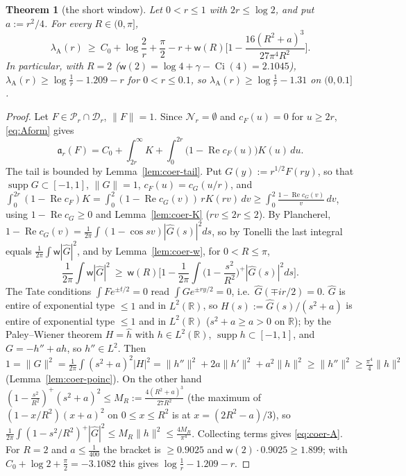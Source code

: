 \documentclass[11pt]{amsart}
\newtheorem{theorem}{Theorem}[section]
\theoremstyle{definition}
\theoremstyle{remark}
\newcommand{\R}{\mathbb R}
\newcommand{\Rel}{\operatorname{Re}}
\newcommand{\supp}{\operatorname{supp}}
\newcommand{\cF}{c_F}
\begin{document}
\begin{theorem}[the short window]\label{thm:coer-A}
Let $0<r\le1$ with $2r\le\log2$, and put $a:=r^2/4$. For every $R\in(0,\pi]$,
\begin{equation}\label{eq:coer-A}
\lambda_{\mathrm A}(r)\ \ge\ C_0+\log\frac2r+\frac\pi2-r+\mathsf w(R)\Big[1-\frac{16(R^2+a)^3}{27\pi^4R^2}\Big].
\end{equation}
In particular, with $R=2$ ($\mathsf w(2)=\log4+\gamma-\operatorname{Ci}(4)=2.1045$),
$\lambda_{\mathrm A}(r)\ge\log\frac1r-1.209-r$ for $0<r\le0.1$, so $\lambda_{\mathrm A}(r)\ge\log\frac1r-1.31$ on $(0,0.1]$.
\end{theorem}
\begin{proof}
Let $F\in\mathcal P_r\cap\mathcal D_r$, $\|F\|=1$. Since $\mathcal N_r=\emptyset$ and $\cF(u)=0$ for $u\ge2r$, \eqref{eq:Aform} gives
\[
\mathfrak a_r(F)=C_0+\int_{2r}^\infty K+\int_0^{2r}\big(1-\Rel\cF(u)\big)K(u)\,du .
\]
The tail is bounded by Lemma~\ref{lem:coer-tail}. Put $G(y):=r^{1/2}F(ry)$, so that $\supp G\subset[-1,1]$, $\|G\|=1$,
$\cF(u)=c_G(u/r)$, and $\int_0^{2r}(1-\Rel\cF)K=\int_0^2(1-\Rel c_G(v))\,rK(rv)\,dv\ge\int_0^2\frac{1-\Rel c_G(v)}v\,dv$, using
$1-\Rel c_G\ge0$ and Lemma~\ref{lem:coer-K} ($rv\le2r\le2$). By Plancherel, $1-\Rel c_G(v)=\frac1{2\pi}\int(1-\cos sv)|\widehat G(s)|^2ds$,
so by Tonelli the last integral equals $\frac1{2\pi}\int\mathsf w|\widehat G|^2$, and by Lemma~\ref{lem:coer-w}, for $0<R\le\pi$,
\[
\frac1{2\pi}\int\mathsf w|\widehat G|^2\ \ge\ \mathsf w(R)\Big[1-\frac1{2\pi}\int\Big(1-\frac{s^2}{R^2}\Big)^+|\widehat G(s)|^2ds\Big].
\]
The Tate conditions $\int Fe^{\pm t/2}=0$ read $\int Ge^{\pm ry/2}=0$, i.e.\ $\widehat G(\mp ir/2)=0$. $\widehat G$ is entire of
exponential type $\le1$ and in $L^2(\R)$, so $H(s):=\widehat G(s)/(s^2+a)$ is entire of exponential type $\le1$ and in $L^2(\R)$
($s^2+a\ge a>0$ on $\R$); by the Paley--Wiener theorem $H=\widehat h$ with $h\in L^2(\R)$, $\supp h\subset[-1,1]$, and
$G=-h''+ah$, so $h''\in L^2$. Then
$1=\|G\|^2=\frac1{2\pi}\int(s^2+a)^2|H|^2=\|h''\|^2+2a\|h'\|^2+a^2\|h\|^2\ge\|h''\|^2\ge\frac{\pi^4}4\|h\|^2$
(Lemma~\ref{lem:coer-poinc}). On the other hand $(1-\frac{s^2}{R^2})^+(s^2+a)^2\le M_R:=\frac{4(R^2+a)^3}{27R^2}$ (the
maximum of $(1-x/R^2)(x+a)^2$ on $0\le x\le R^2$ is at $x=(2R^2-a)/3$), so
$\frac1{2\pi}\int(1-s^2/R^2)^+|\widehat G|^2\le M_R\|h\|^2\le\frac{4M_R}{\pi^4}$. Collecting terms gives \eqref{eq:coer-A}. For
$R=2$ and $a\le\frac1{400}$ the bracket is $\ge0.9025$ and $\mathsf w(2)\cdot0.9025\ge1.899$; with
$C_0+\log2+\frac\pi2=-3.1082$ this gives $\log\frac1r-1.209-r$.
\end{proof}
\end{document}

